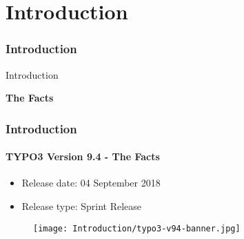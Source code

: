 %


\section{Introduction}
\begin{frame}[fragile]
	\frametitle{Introduction}

	\begin{center}\huge{Introduction}\end{center}
	\begin{center}\huge{\color{typo3darkgrey}\textbf{The Facts}}\end{center}

\end{frame}


\begin{frame}[fragile]
	\frametitle{Introduction}
	\framesubtitle{TYPO3 Version 9.4 - The Facts}

	\begin{itemize}
		\item Release date: 04 September 2018
		\item Release type: Sprint Release
	\end{itemize}

	\begin{figure}
		\texttt{[image: Introduction/typo3-v94-banner.jpg]}
	\end{figure}

\end{frame}


